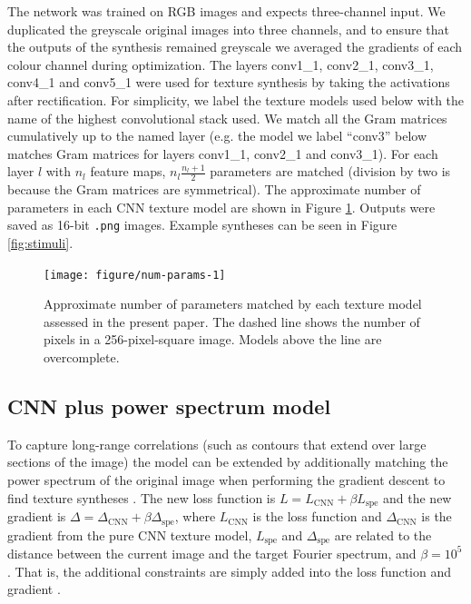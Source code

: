 \documentclass[article, 11pt,a4paper,natbib]{apa6}\usepackage[]{graphicx}\usepackage[]{color}
\newenvironment{knitrout}{}{} %
\begin{document}
The network was trained on RGB images and expects three-channel input.
We duplicated the greyscale original images into three channels, and to ensure that the outputs of the synthesis remained greyscale we averaged the gradients of each colour channel during optimization.
The layers conv1\_1, conv2\_1, conv3\_1, conv4\_1 and conv5\_1 were used for texture synthesis by taking the activations after rectification.
For simplicity, we label the texture models used below with the name of the highest convolutional stack used.
We match all the Gram matrices cumulatively up to the named layer (e.g. the model we label ``conv3'' below matches Gram matrices for layers conv1\_1, conv2\_1 and conv3\_1).
For each layer $l$ with $n_l$ feature maps, $n_l \frac{n_l + 1}{2}$ parameters are matched (division by two is because the Gram matrices are symmetrical).
The approximate number of parameters in each CNN texture model are shown in Figure \ref{fig:num-params}.
Outputs were saved as 16-bit \texttt{.png} images.
Example syntheses can be seen in Figure \ref{fig:stimuli}.



\begin{knitrout}
\color{fgcolor}\begin{figure}
\texttt{[image: figure/num-params-1]} \caption[Approximate number of parameters matched by each texture model assessed in the present paper]{Approximate number of parameters matched by each texture model assessed in the present paper. The dashed line shows the number of pixels in a 256-pixel-square image. Models above the line are overcomplete.}\label{fig:num-params}
\end{figure}


\end{knitrout}


\subsection{CNN plus power spectrum model}

To capture long-range correlations (such as contours that extend over large sections of the image) the model can be extended by additionally matching the power spectrum of the original image when performing the gradient descent to find texture syntheses \citep{liu_texture_2016}. 
The new loss function is $L = L_{\mathrm{CNN}} + \beta L_{\mathrm{spe}}$ 
and the new gradient is  $\Delta = \Delta_{\mathrm{CNN}} + \beta \Delta_{\mathrm{spe}}$, 
where $L_{\mathrm{CNN}}$ is the loss function and $\Delta_{\mathrm{CNN}}$ is the gradient from the pure CNN texture model, $L_{\mathrm{spe}}$ and $\Delta_{\mathrm{spe}}$ are related to the distance between the current image and the target Fourier spectrum, and $\beta = 10^5$.
That is, the additional constraints are simply added into the loss function and gradient \citep[see][for further details]{liu_texture_2016}.
\end{document}
